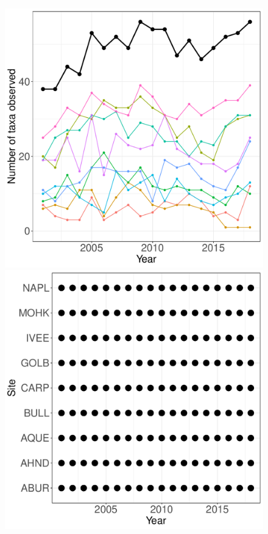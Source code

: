\documentclass[11pt, oneside]{article}
\begin{document}
\begin{figure}[h!]
\centering
\includegraphics[scale = 0.4]{sbc-sessileInverts-castorani_species_accumulation_curve.pdf}
\includegraphics[scale = 0.4]{sbc-sessileInverts-castorani_num_taxa_over_time.pdf}
\includegraphics[scale = 0.4]{sbc-sessileInverts-castorani_spatiotemporal_sampling_effort.pdf}

\end{figure}
\end{document}
